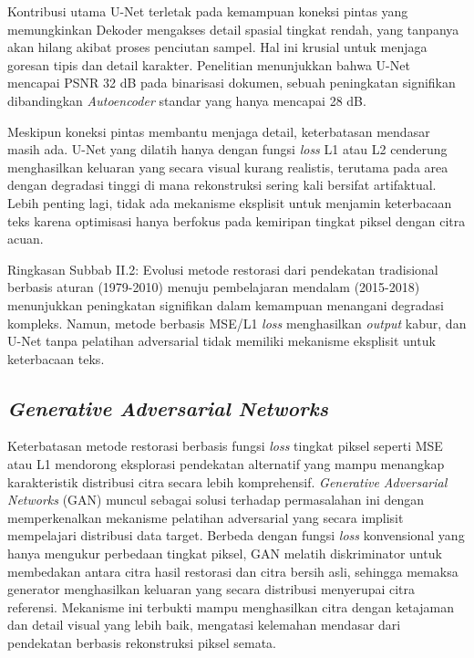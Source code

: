 \begin{enumerate}[leftmargin=*, labelindent=0pt, itemsep=1ex, topsep=0pt]
Kontribusi utama U-Net terletak pada kemampuan koneksi pintas yang memungkinkan Dekoder mengakses detail spasial tingkat rendah, yang tanpanya akan hilang akibat proses penciutan sampel. Hal ini krusial untuk menjaga goresan tipis dan detail karakter. Penelitian \parencite{tensmeyer2017} menunjukkan bahwa U-Net mencapai PSNR 32 dB pada binarisasi dokumen, sebuah peningkatan signifikan dibandingkan \textit{Autoencoder} standar yang hanya mencapai 28 dB.

Meskipun koneksi pintas membantu menjaga detail, keterbatasan mendasar masih ada. U-Net yang dilatih hanya dengan fungsi \textit{loss} L1 atau L2 cenderung menghasilkan keluaran yang secara visual kurang realistis, terutama pada area dengan degradasi tinggi di mana rekonstruksi sering kali bersifat artifaktual. Lebih penting lagi, tidak ada mekanisme eksplisit untuk menjamin keterbacaan teks karena optimisasi hanya berfokus pada kemiripan tingkat piksel dengan citra acuan.

\end{enumerate}

Ringkasan Subbab II.2: Evolusi metode restorasi dari pendekatan tradisional berbasis aturan (1979-2010) menuju pembelajaran mendalam (2015-2018) menunjukkan peningkatan signifikan dalam kemampuan menangani degradasi kompleks. Namun, metode berbasis MSE/L1 \textit{loss} menghasilkan \textit{output} kabur, dan U-Net tanpa \textnormal{pelatihan adversarial} tidak memiliki mekanisme eksplisit untuk keterbacaan teks.


\subsection{\textit{Generative Adversarial Networks}}
\label{subsec:gan-theory}

Keterbatasan metode restorasi berbasis fungsi \textit{loss} tingkat piksel seperti MSE atau L1 mendorong eksplorasi pendekatan alternatif yang mampu menangkap karakteristik distribusi citra secara lebih komprehensif. \textit{Generative Adversarial Networks} (GAN) muncul sebagai solusi terhadap permasalahan ini dengan memperkenalkan mekanisme pelatihan adversarial yang secara implisit mempelajari distribusi data target. Berbeda dengan fungsi \textit{loss} konvensional yang hanya mengukur perbedaan tingkat piksel, GAN melatih diskriminator untuk membedakan antara citra hasil restorasi dan citra bersih asli, sehingga memaksa generator menghasilkan keluaran yang secara distribusi menyerupai citra referensi. Mekanisme ini terbukti mampu menghasilkan citra dengan ketajaman dan detail visual yang lebih baik, mengatasi kelemahan mendasar dari pendekatan berbasis rekonstruksi piksel semata.

